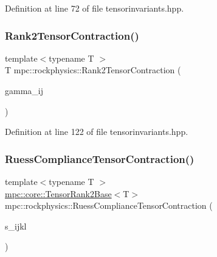 Definition at line 72 of file tensorinvariants.\+hpp.

\mbox{\label{namespacempc_1_1rockphysics_a70f32dd89107171a423f129c9a33ee8d}} 
\subsubsection{\texorpdfstring{Rank2\+Tensor\+Contraction()}{Rank2TensorContraction()}}
{\footnotesize\ttfamily template$<$typename T $>$ \\
T mpc\+::rockphysics\+::\+Rank2\+Tensor\+Contraction (\begin{DoxyParamCaption}\item[{const \mbox{\hyperlink{structmpc_1_1core_1_1_tensor_rank2_base}{mpc\+::core\+::\+Tensor\+Rank2\+Base}}$<$ T $>$ \&}]{gamma\+\_\+ij }\end{DoxyParamCaption})}



Definition at line 122 of file tensorinvariants.\+hpp.

\mbox{\label{namespacempc_1_1rockphysics_af0944164902bfb3aee857caed6c2d07f}} 
\subsubsection{\texorpdfstring{Ruess\+Compliance\+Tensor\+Contraction()}{RuessComplianceTensorContraction()}}
{\footnotesize\ttfamily template$<$typename T $>$ \\
\mbox{\hyperlink{structmpc_1_1core_1_1_tensor_rank2_base}{mpc\+::core\+::\+Tensor\+Rank2\+Base}}$<$T$>$ mpc\+::rockphysics\+::\+Ruess\+Compliance\+Tensor\+Contraction (\begin{DoxyParamCaption}\item[{const \mbox{\hyperlink{structmpc_1_1core_1_1_compliance_tensor}{mpc\+::core\+::\+Compliance\+Tensor}}$<$ T $>$ \&}]{s\+\_\+ijkl }\end{DoxyParamCaption})}



